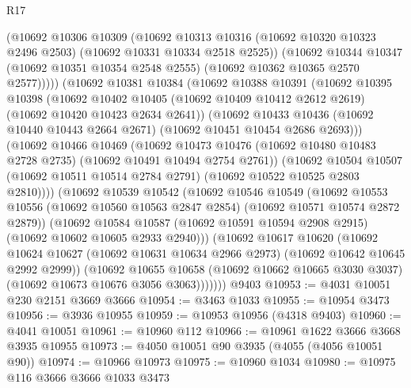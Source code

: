 \begin{lexlean}{R17}
\begin{coremodule}
            (@10692
              @10306
              @10309
              (@10692
                @10313
                @10316
                (@10692 @10320 @10323 @2496 @2503)
                (@10692 @10331 @10334 @2518 @2525))
              (@10692
                @10344
                @10347
                (@10692 @10351 @10354 @2548 @2555)
                (@10692 @10362 @10365 @2570 @2577)))))
        (@10692
          @10381
          @10384
          (@10692
            @10388
            @10391
            (@10692
              @10395
              @10398
              (@10692
                @10402
                @10405
                (@10692 @10409 @10412 @2612 @2619)
                (@10692 @10420 @10423 @2634 @2641))
              (@10692
                @10433
                @10436
                (@10692 @10440 @10443 @2664 @2671)
                (@10692 @10451 @10454 @2686 @2693)))
            (@10692
              @10466
              @10469
              (@10692
                @10473
                @10476
                (@10692 @10480 @10483 @2728 @2735)
                (@10692 @10491 @10494 @2754 @2761))
              (@10692
                @10504
                @10507
                (@10692 @10511 @10514 @2784 @2791)
                (@10692 @10522 @10525 @2803 @2810))))
          (@10692
            @10539
            @10542
            (@10692
              @10546
              @10549
              (@10692
                @10553
                @10556
                (@10692 @10560 @10563 @2847 @2854)
                (@10692 @10571 @10574 @2872 @2879))
              (@10692
                @10584
                @10587
                (@10692 @10591 @10594 @2908 @2915)
                (@10692 @10602 @10605 @2933 @2940)))
            (@10692
              @10617
              @10620
              (@10692
                @10624
                @10627
                (@10692 @10631 @10634 @2966 @2973)
                (@10692 @10642 @10645 @2992 @2999))
              (@10692
                @10655
                @10658
                (@10692 @10662 @10665 @3030 @3037)
                (@10692 @10673 @10676 @3056 @3063)))))))
    @9403
@10953 := @4031 @10051 @230 @2151 @3669 @3666
@10954 := @3463 @1033
@10955 := @10954 @3473
@10956 := @3936 @10955
@10959 := @10953 @10956 (@4318 @9403)
@10960 := @4041 @10051
@10961 := @10960 @112
@10966 := @10961 @1622 @3666 @3668 @3935 @10955
@10973 := @4050 @10051 @90 @3935 (@4055 (@4056 @10051 @90))
@10974 := @10966 @10973
@10975 := @10960 @1034
@10980 := @10975 @116 @3666 @3666 @1033 @3473

\end{coremodule}
\end{lexlean}
